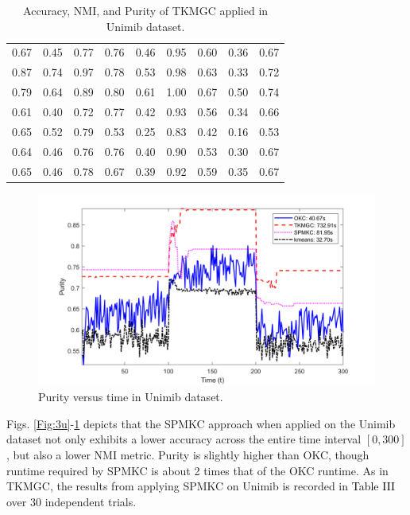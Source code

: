 \documentclass[10pt,final]{IEEEtran}
\begin{document}
\begin{center}
\begin{table}[h!]
\begin{tabular}{|c|c|c|c|c|c|c|c|c|}
    0.67 & 0.45 & 0.77 & 0.76 & 0.46 & 0.95 & 0.60 & 0.36 & 0.67\\
    0.87 & 0.74 & 0.97 & 0.78 & 0.53 & 0.98 & 0.63 & 0.33 & 0.72\\
    0.79 & 0.64 & 0.89 & 0.80 & 0.61 & 1.00 & 0.67 & 0.50 & 0.74\\
    0.61 & 0.40 & 0.72 & 0.77 & 0.42 & 0.93 & 0.56 & 0.34 & 0.66\\
    0.65 & 0.52 & 0.79 & 0.53 & 0.25 & 0.83 & 0.42 & 0.16 & 0.53\\
    0.64 & 0.46 & 0.76 & 0.76 & 0.40 & 0.90 & 0.53 & 0.30 & 0.67\\
    0.65 & 0.46 & 0.78 & 0.67 & 0.39 & 0.92 & 0.59 & 0.35 & 0.67\\
    \hline
\end{tabular}
\caption{\label{tab:Table II}Accuracy, NMI, and Purity of TKMGC applied in Unimib dataset.}
\end{table}
\end{center}

\begin{figure}[htp]
    \centering
    \includegraphics[scale=0.19]{avg_combined_Purity_plots_Unimib.png}
    \caption{Purity versus time in Unimib dataset.}
    \label{Fig:5u}
\end{figure}
Figs. \ref{Fig:3u}-\ref{Fig:5u} depicts that the SPMKC approach when applied on the Unimib dataset not only exhibits a lower accuracy across the entire time interval $[0,300]$, but also a lower NMI metric. Purity is slightly higher  than OKC, though runtime required by  SPMKC is about 2 times that of the OKC runtime. As in TKMGC, the results from applying SPMKC on Unimib is recorded in \textcolor{black}{{Table III}} over 30 independent trials.
\end{document}
